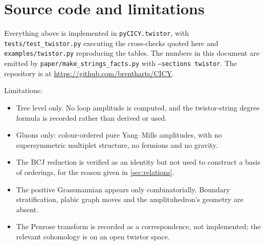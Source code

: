 \documentclass[11pt,a4paper]{article}
\theoremstyle{definition}
\begin{document}
\section{Source code and limitations}
\label{sec:source}
\footnotesize
Everything above is implemented in \texttt{pyCICY.twistor}, with
\texttt{tests/test\_twistor.py} executing the cross-checks quoted here and
\texttt{examples/twistor.py} reproducing the tables. The numbers in this
document are emitted by \texttt{paper/make\_strings\_facts.py} with
\texttt{--sections twistor}. The repository is at
\url{https://github.com/brentharts/CICY}.

Limitations:
%
\begin{itemize}[leftmargin=2em,itemsep=1pt]
\item Tree level only. No loop amplitude is computed, and the twistor-string
degree formula is recorded rather than derived or used.
\item Gluons only: colour-ordered pure Yang--Mills amplitudes, with no
supersymmetric multiplet structure, no fermions and no gravity.
\item The BCJ reduction is verified as an identity but not used to construct
a basis of orderings, for the reason given in \cref{sec:relations}.
\item The positive Grassmannian appears only combinatorially. Boundary
stratification, plabic graph moves \cite{Affolter} and the amplituhedron's geometry \cite{ArkaniHamedTrnka2013} are
absent.
\item The Penrose transform is recorded as a correspondence, not implemented;
the relevant cohomology is on an open twistor space.
\end{itemize}

\end{document}
